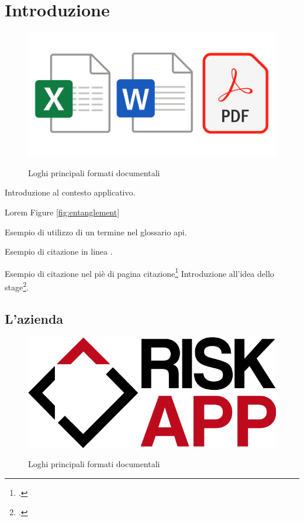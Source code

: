 \chapter{Introduzione}
\label{chap:introduzione}

\begin{figure}[H]
    \centering
    \includegraphics[alt={Logo docx, xlsx e pdf}, width=1\columnwidth]{img/format_logos.jpg}
    \caption{Loghi principali formati documentali}
    \label{fig:logos}
\end{figure}

Introduzione al contesto applicativo.

Lorem Figure \ref{fig:entanglement}

Esempio di utilizzo di un termine nel glossario \gls{api}.

Esempio di citazione in linea \cite{site:agile-manifesto}.

Esempio di citazione nel piè di pagina citazione\footcite{womak:lean-thinking}
Introduzione all'idea dello stage\footcite{article:spooky}.

\lipsum[1-2]

\section{L'azienda}

\begin{figure}[H]
    \centering
    \includegraphics[alt={Logo docx, xlsx e pdf}, width=0.5\columnwidth]{img/riskapp_logo.png}
    \caption{Loghi principali formati documentali}
    \label{fig:riskapp}
\end{figure}

